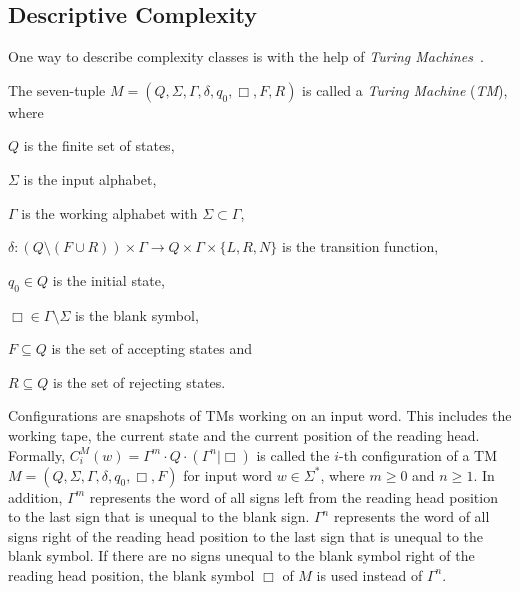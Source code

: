
\subsection{Descriptive Complexity}\label{subsec:descriptiveComplexity}

One way to describe complexity classes is with the help of \textit{Turing Machines}~\cite{hopcroft1994einfuehrung}.

\begin{definition}
    The seven-tuple $M = (Q, \Sigma, \Gamma, \delta, q_0, \Box, F, R)$ is called a \emph{Turing Machine} (\emph{TM}),
    where
    \begin{compactitem}
        \item $Q$ is the finite set of states,
        \item $\Sigma$ is the input alphabet,
        \item $\Gamma$ is the working alphabet with $\Sigma \subset \Gamma$,
        \item $\delta : (Q \setminus (F \cup R)) \times \Gamma \rightarrow Q \times \Gamma \times \{L, R, N\}$ is the
        transition function,
        \item $q_0 \in Q$ is the initial state,
        \item $\Box \in \Gamma \setminus \Sigma$ is the blank symbol,
        \item $F \subseteq Q$ is the set of accepting states and
        \item $R \subseteq Q$ is the set of rejecting states.
    \end{compactitem}
\end{definition}

Configurations are snapshots of TMs working on an input word. This includes the working tape, the current state and
the current position of the reading head. Formally, $C_i^M(w) = \Gamma^m \cdot Q \cdot (\Gamma^n | \Box)$ is called the
$i$-th configuration of a TM $M = (Q, \Sigma, \Gamma, \delta, q_0, \Box, F)$ for input word $w \in \Sigma^*$,
where $m \geq 0$ and $n \geq 1$. In addition, $\Gamma^m$ represents the word of all signs left from the reading head
position to the last sign that is unequal to the blank sign. $\Gamma^n$ represents the word of all signs right of the
reading head position to the last sign that is unequal to the blank symbol. If there are no signs unequal to the blank
symbol right of the reading head position, the blank symbol $\Box$ of $M$ is used instead of $\Gamma^n$.

